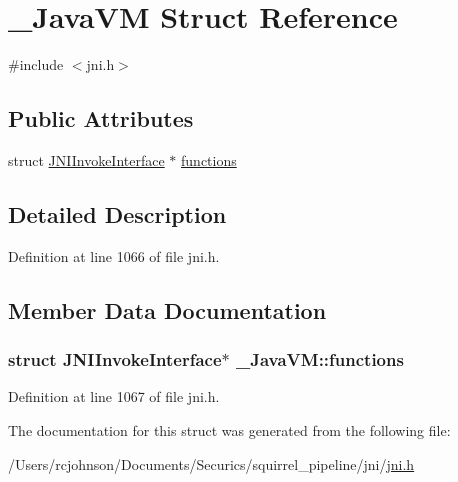 \hypertarget{struct___java_v_m}{\section{\-\_\-\-Java\-V\-M Struct Reference}
\label{struct___java_v_m}
}


{\ttfamily \#include $<$jni.\-h$>$}

\subsection*{Public Attributes}
\begin{DoxyCompactItemize}
\item 
struct \hyperlink{struct_j_n_i_invoke_interface}{J\-N\-I\-Invoke\-Interface} $\ast$ \hyperlink{struct___java_v_m_aad1eb9c5f99ef136f09aba7b8c230f65}{functions}
\end{DoxyCompactItemize}


\subsection{Detailed Description}


Definition at line 1066 of file jni.\-h.



\subsection{Member Data Documentation}
\hypertarget{struct___java_v_m_aad1eb9c5f99ef136f09aba7b8c230f65}{
\subsubsection[{functions}]{\setlength{\rightskip}{0pt plus 5cm}struct {\bf J\-N\-I\-Invoke\-Interface}$\ast$ \-\_\-\-Java\-V\-M\-::functions}}\label{struct___java_v_m_aad1eb9c5f99ef136f09aba7b8c230f65}


Definition at line 1067 of file jni.\-h.



The documentation for this struct was generated from the following file\-:\begin{DoxyCompactItemize}
\item 
/\-Users/rcjohnson/\-Documents/\-Securics/squirrel\-\_\-pipeline/jni/\hyperlink{jni_8h}{jni.\-h}\end{DoxyCompactItemize}

